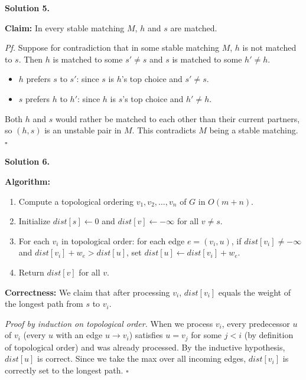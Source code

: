 \documentclass[10pt]{article}
\newcounter{prob}
\begin{document}
\bigskip

\noindent\textbf{Solution 5.}\par\smallskip

\textbf{Claim:} In every stable matching $M$, $h$ and $s$ are matched.

\textit{Pf.} Suppose for contradiction that in some stable matching $M$, $h$ is not matched to $s$. Then $h$ is matched to some $s' \ne s$ and $s$ is matched to some $h' \ne h$.

\begin{itemize}
  \item $h$ prefers $s$ to $s'$: since $s$ is $h$'s top choice and $s' \ne s$.
  \item $s$ prefers $h$ to $h'$: since $h$ is $s$'s top choice and $h' \ne h$.
\end{itemize}

Both $h$ and $s$ would rather be matched to each other than their current partners, so $(h, s)$ is an unstable pair in $M$. This contradicts $M$ being a stable matching. $\square$

\bigskip

\noindent\textbf{Solution 6.}\par\smallskip

\textbf{Algorithm:}
\begin{enumerate}
  \item Compute a topological ordering $v_1, v_2, \dots, v_n$ of $G$ in $O(m+n)$.
  \item Initialize $dist[s] \leftarrow 0$ and $dist[v] \leftarrow -\infty$ for all $v \ne s$.
  \item For each $v_i$ in topological order: for each edge $e = (v_i, u)$, if $dist[v_i] \ne -\infty$ and $dist[v_i] + w_e > dist[u]$, set $dist[u] \leftarrow dist[v_i] + w_e$.
  \item Return $dist[v]$ for all $v$.
\end{enumerate}

\textbf{Correctness:} We claim that after processing $v_i$, $dist[v_i]$ equals the weight of the longest path from $s$ to $v_i$.

\textit{Proof by induction on topological order.} When we process $v_i$, every predecessor $u$ of $v_i$ (every $u$ with an edge $u \to v_i$) satisfies $u = v_j$ for some $j < i$ (by definition of topological order) and was already processed. By the inductive hypothesis, $dist[u]$ is correct. Since we take the max over all incoming edges, $dist[v_i]$ is correctly set to the longest path. $\square$
\end{document}
